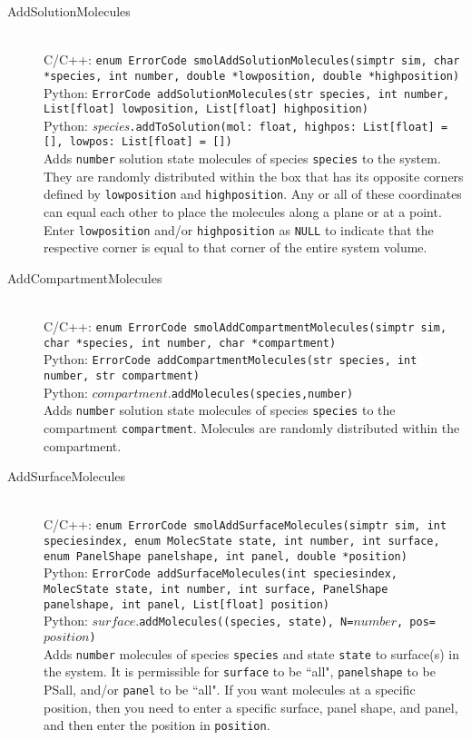 \documentclass {scrbook}
\newcommand {\ttt} {\texttt}
\begin{document}
\begin{description}
\item[AddSolutionMolecules]
\hfill \\
C/C++: \ttt{enum ErrorCode smolAddSolutionMolecules(simptr sim, char *species, int number, double *lowposition, double *highposition)}\\
Python: \ttt{ErrorCode addSolutionMolecules(str species, int number, List[float] lowposition, List[float] highposition)}\\
Python: \textit{species}\ttt{.addToSolution(mol: float, highpos: List[float] = [], lowpos: List[float] = [])}\\
Adds \ttt{number} solution state molecules of species \ttt{species} to the system. They are randomly distributed within the box that has its opposite corners defined by \ttt{lowposition} and \ttt{highposition}. Any or all of these coordinates can equal each other to place the molecules along a plane or at a point. Enter \ttt{lowposition} and/or \ttt{highposition} as \ttt{NULL} to indicate that the respective corner is equal to that corner of the entire system volume.

\item[AddCompartmentMolecules]
\hfill \\
C/C++: \ttt{enum ErrorCode smolAddCompartmentMolecules(simptr sim, char *species, int number, char *compartment)}\\
Python: \ttt{ErrorCode addCompartmentMolecules(str species, int number, str compartment)}\\
Python: $compartment$.\ttt{addMolecules(species,number)}\\
Adds \ttt{number} solution state molecules of species \ttt{species} to the compartment \ttt{compartment}. Molecules are randomly distributed within the compartment.

\item[AddSurfaceMolecules]
\hfill \\
C/C++: \ttt{enum ErrorCode smolAddSurfaceMolecules(simptr sim, int speciesindex, enum MolecState state, int number, int surface, enum PanelShape panelshape, int panel, double *position)}\\
Python: \ttt{ErrorCode addSurfaceMolecules(int speciesindex, MolecState state, int number, int surface, PanelShape panelshape, int panel, List[float] position)}\\
Python: $surface$.\ttt{addMolecules((species, state), N=$number$, pos=$position$)}\\
Adds \ttt{number} molecules of species \ttt{species} and state \ttt{state} to surface(s) in the system. It is permissible for \ttt{surface} to be ``all", \ttt{panelshape} to be PSall, and/or \ttt{panel} to be ``all". If you want molecules at a specific position, then you need to enter a specific surface, panel shape, and panel, and then enter the position in \ttt{position}.


\end{description}
\end{document}

